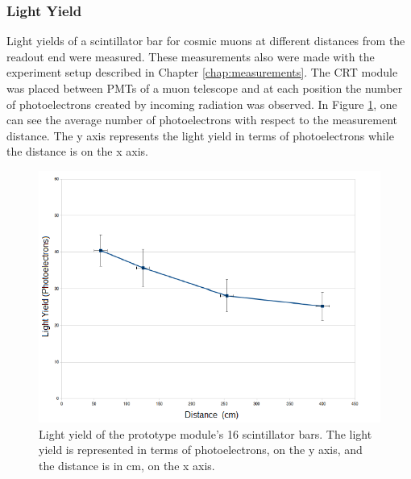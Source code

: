 \documentclass[a4paper]{article}\linespread{1.4}
\begin{document}
\subsubsection{Light Yield}
Light yields of a scintillator bar for cosmic muons at different distances from the readout end were measured. These measurements also were made with the experiment setup described in Chapter \ref{chap:measurements}. 
The CRT module was placed between PMTs of a muon telescope and at each position the number of photoelectrons created by incoming radiation was observed. In Figure \ref{lyo}, one can see the average number of photoelectrons with respect to the measurement distance. The y axis represents the light yield in terms of photoelectrons while the distance is on the x axis. 
\begin{figure}[h!] \centering \includegraphics[width=135mm,scale=1.0]{lyo.png} \caption{Light yield of the prototype module's 16 scintillator bars. The light yield is represented in terms of photoelectrons, on the y axis, and the distance is in cm, on the x axis. \cite{E}}  \label{lyo} \end{figure}
\end{document}
